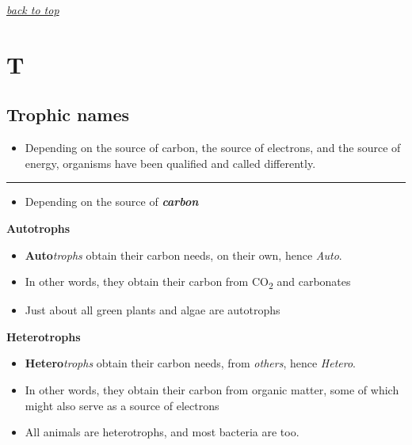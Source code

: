 \documentclass[]{book}
\providecommand{\tightlist}{%
  \setlength{\itemsep}{0pt}\setlength{\parskip}{0pt}}
\theoremstyle{definition}
\theoremstyle{definition}
\theoremstyle{definition}
\theoremstyle{remark}
\begin{document}
\emph{\protect\hyperlink{top}{back to top}}

\section{T}\label{t}

\hypertarget{trophic-names}{\subsection{Trophic
names}\label{trophic-names}}

\begin{itemize}
\tightlist
\item
  Depending on the source of carbon, the source of electrons, and the
  source of energy, organisms have been qualified and called
  differently.
\end{itemize}

\begin{center}\rule{0.5\linewidth}{\linethickness}\end{center}

\begin{itemize}
\tightlist
\item
  Depending on the source of \emph{\textbf{carbon}}
\end{itemize}

\textbf{Autotrophs}

\begin{itemize}
\tightlist
\item
  \textbf{Auto}\emph{trophs} obtain their carbon needs, on their own,
  hence \emph{Auto}.
\item
  In other words, they obtain their carbon from CO\textsubscript{2} and
  carbonates
\item
  Just about all green plants and algae are autotrophs
\end{itemize}

\textbf{Heterotrophs}

\begin{itemize}
\tightlist
\item
  \textbf{Hetero}\emph{trophs} obtain their carbon needs, from
  \emph{others}, hence \emph{Hetero}.
\item
  In other words, they obtain their carbon from organic matter, some of
  which might also serve as a source of electrons
\item
  All animals are heterotrophs, and most bacteria are too.
\end{itemize}
\end{document}
